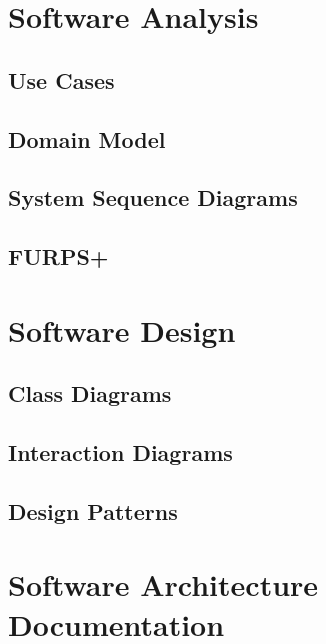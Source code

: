 \documentclass[a4paper,11pt]{article}
\begin{document}
\pagebreak
\section{Software Analysis}


\subsection{Use Cases}


\subsection{Domain Model}


\subsection{System Sequence Diagrams}


\subsection{FURPS+}


\pagebreak
\section{Software Design}


\subsection{Class Diagrams}


\subsection{Interaction Diagrams}


\subsection{Design Patterns}



\pagebreak
\section{Software Architecture Documentation}

\end{document}

